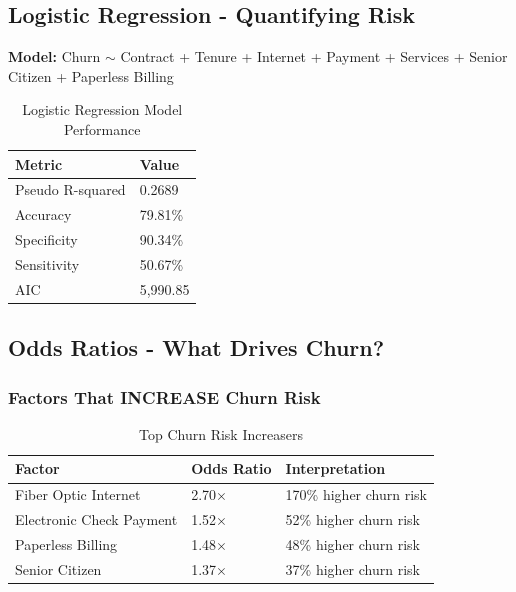 \documentclass[11pt,a4paper]{article}
\begin{document}
\subsection{Logistic Regression - Quantifying Risk}

\textbf{Model:} Churn $\sim$ Contract + Tenure + Internet + Payment + Services + Senior Citizen + Paperless Billing

\begin{table}[H]
\centering
\begin{tabular}{p{4cm} p{3cm}}
\toprule
\rowcolor{primary!10}
\textbf{Metric} & \textbf{Value} \\
\midrule
Pseudo R-squared & 0.2689 \\
Accuracy & 79.81\% \\
Specificity & 90.34\% \\
Sensitivity & 50.67\% \\
AIC & 5,990.85 \\
\bottomrule
\end{tabular}
\caption{Logistic Regression Model Performance}
\end{table}

\subsection{Odds Ratios - What Drives Churn?}

\subsubsection{Factors That INCREASE Churn Risk}

\begin{table}[H]
\centering
\begin{tabular}{p{4.5cm} p{2.5cm} p{4.5cm}}
\toprule
\rowcolor{primary!10}
\textbf{Factor} & \textbf{Odds Ratio} & \textbf{Interpretation} \\
\midrule
\rowcolor{churnred!15}
Fiber Optic Internet & 2.70$\times$ & 170\% higher churn risk \\
Electronic Check Payment & 1.52$\times$ & 52\% higher churn risk \\
Paperless Billing & 1.48$\times$ & 48\% higher churn risk \\
Senior Citizen & 1.37$\times$ & 37\% higher churn risk \\
\bottomrule
\end{tabular}
\caption{Top Churn Risk Increasers}
\end{table}
\end{document}
